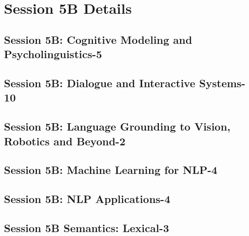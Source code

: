 \newpage
\section{Session 5B Details}
\subsection{\large Session 5B: Cognitive Modeling and Psycholinguistics-5}
\label{parallel-session-5B-trackA}
\TrackALoc\hfill\sessionchair{}{}
\clearpage
\subsection{\large Session 5B: Dialogue and Interactive Systems-10}
\label{parallel-session-5B-trackB}
\TrackBLoc\hfill\sessionchair{}{}
\clearpage
\subsection{\large Session 5B: Language Grounding to Vision, Robotics and Beyond-2}
\label{parallel-session-5B-trackC}
\TrackCLoc\hfill\sessionchair{}{}
\clearpage
\subsection{\large Session 5B: Machine Learning for NLP-4}
\label{parallel-session-5B-trackD}
\TrackDLoc\hfill\sessionchair{}{}
\clearpage
\subsection{\large Session 5B: NLP Applications-4}
\label{parallel-session-5B-trackE}
\TrackELoc\hfill\sessionchair{}{}
\clearpage
\subsection{\large Session 5B Semantics: Lexical-3}
\label{parallel-session-5B-trackF}
\TrackFLoc\hfill\sessionchair{}{}
\clearpage


